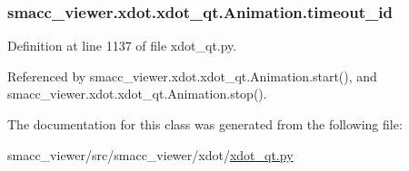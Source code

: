 \subsubsection[{\texorpdfstring{timeout\+\_\+id}{timeout_id}}]{\setlength{\rightskip}{0pt plus 5cm}smacc\+\_\+viewer.\+xdot.\+xdot\+\_\+qt.\+Animation.\+timeout\+\_\+id}\hypertarget{classsmacc__viewer_1_1xdot_1_1xdot__qt_1_1Animation_a9008b50eeabf48c6cea1ae475ea37d7f}{}\label{classsmacc__viewer_1_1xdot_1_1xdot__qt_1_1Animation_a9008b50eeabf48c6cea1ae475ea37d7f}


Definition at line 1137 of file xdot\+\_\+qt.\+py.



Referenced by smacc\+\_\+viewer.\+xdot.\+xdot\+\_\+qt.\+Animation.\+start(), and smacc\+\_\+viewer.\+xdot.\+xdot\+\_\+qt.\+Animation.\+stop().



The documentation for this class was generated from the following file\+:\begin{DoxyCompactItemize}
\item 
smacc\+\_\+viewer/src/smacc\+\_\+viewer/xdot/\hyperlink{xdot__qt_8py}{xdot\+\_\+qt.\+py}\end{DoxyCompactItemize}
